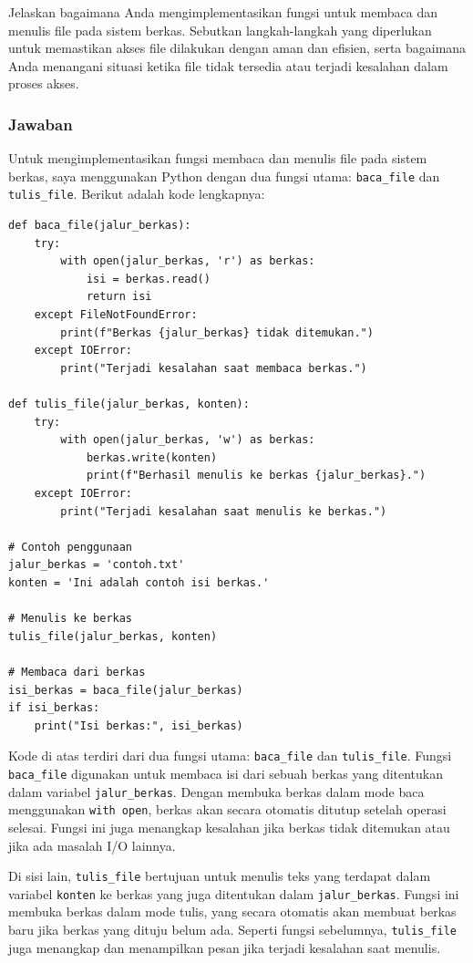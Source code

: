 \documentclass[12pt]{article}
\begin{document}
Jelaskan bagaimana Anda mengimplementasikan fungsi untuk membaca dan menulis file pada sistem berkas. Sebutkan langkah-langkah yang diperlukan untuk memastikan akses file dilakukan dengan aman dan efisien, serta bagaimana Anda menangani situasi ketika file tidak tersedia atau terjadi kesalahan dalam proses akses.

\subsubsection{Jawaban}

Untuk mengimplementasikan fungsi membaca dan menulis file pada sistem berkas, saya menggunakan Python dengan dua fungsi utama: \texttt{baca\_file} dan \texttt{tulis\_file}. Berikut adalah kode lengkapnya:

\begin{verbatim}
def baca_file(jalur_berkas):
    try:
        with open(jalur_berkas, 'r') as berkas:
            isi = berkas.read()
            return isi
    except FileNotFoundError:
        print(f"Berkas {jalur_berkas} tidak ditemukan.")
    except IOError:
        print("Terjadi kesalahan saat membaca berkas.")

def tulis_file(jalur_berkas, konten):
    try:
        with open(jalur_berkas, 'w') as berkas:
            berkas.write(konten)
            print(f"Berhasil menulis ke berkas {jalur_berkas}.")
    except IOError:
        print("Terjadi kesalahan saat menulis ke berkas.")

# Contoh penggunaan
jalur_berkas = 'contoh.txt'
konten = 'Ini adalah contoh isi berkas.'

# Menulis ke berkas
tulis_file(jalur_berkas, konten)

# Membaca dari berkas
isi_berkas = baca_file(jalur_berkas)
if isi_berkas:
    print("Isi berkas:", isi_berkas)
\end{verbatim}

Kode di atas terdiri dari dua fungsi utama: \texttt{baca\_file} dan \texttt{tulis\_file}. Fungsi \texttt{baca\_file} digunakan untuk membaca isi dari sebuah berkas yang ditentukan dalam variabel \texttt{jalur\_berkas}. Dengan membuka berkas dalam mode baca menggunakan \texttt{with open}, berkas akan secara otomatis ditutup setelah operasi selesai. Fungsi ini juga menangkap kesalahan jika berkas tidak ditemukan atau jika ada masalah I/O lainnya.

Di sisi lain, \texttt{tulis\_file} bertujuan untuk menulis teks yang terdapat dalam variabel \texttt{konten} ke berkas yang juga ditentukan dalam \texttt{jalur\_berkas}. Fungsi ini membuka berkas dalam mode tulis, yang secara otomatis akan membuat berkas baru jika berkas yang dituju belum ada. Seperti fungsi sebelumnya, \texttt{tulis\_file} juga menangkap dan menampilkan pesan jika terjadi kesalahan saat menulis.
\end{document}
